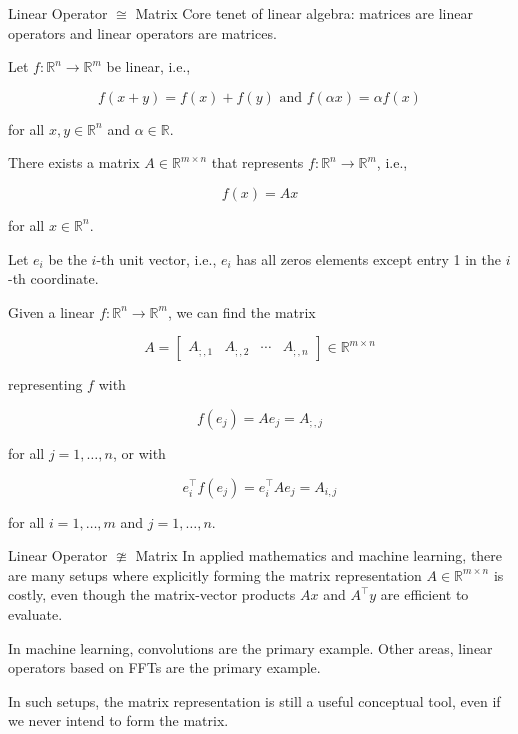 \begin{frame}[allowframebreaks]

\begin{myconceptblock}{8.12}{Linear Operator $\cong$ Matrix}
    Core tenet of linear algebra: matrices are linear operators and linear operators are matrices.

    Let $f: \mathbb{R}^{n} \rightarrow \mathbb{R}^{m}$ be linear, i.e.,

    $$
    f(x+y)=f(x)+f(y) \text { and } f(\alpha x)=\alpha f(x)
    $$

    for all $x, y \in \mathbb{R}^{n}$ and $\alpha \in \mathbb{R}$.

    There exists a matrix $A \in \mathbb{R}^{m \times n}$ that represents $f: \mathbb{R}^{n} \rightarrow \mathbb{R}^{m}$, i.e.,

    $$
    f(x)=A x
    $$

    for all $x \in \mathbb{R}^{n}$.

    Let $e_{i}$ be the $i$-th unit vector, i.e., $e_{i}$ has all zeros elements except entry 1 in the $i$-th coordinate.

    Given a linear $f: \mathbb{R}^{n} \rightarrow \mathbb{R}^{m}$, we can find the matrix

    $$
    A=\left[\begin{array}{llll}
    A_{;, 1} & A_{;, 2} & \cdots & A_{;, n}
    \end{array}\right] \in \mathbb{R}^{m \times n}
    $$

    representing $f$ with

    $$
    f\left(e_{j}\right)=A e_{j}=A_{;, j}
    $$

    for all $j=1, \ldots, n$, or with

    $$
    e_{i}^{\top} f\left(e_{j}\right)=e_{i}^{\top} A e_{j}=A_{i, j}
    $$

    for all $i=1, \ldots, m$ and $j=1, \ldots, n$.
\end{myconceptblock}

\end{frame}

\begin{frame}[allowframebreaks]

\begin{myconceptblock}{8.13}{Linear Operator $\ncong$ Matrix}
    In applied mathematics and machine learning, there are many setups where explicitly forming the matrix representation $A \in \mathbb{R}^{m \times n}$ is costly, even though the matrix-vector products $A x$ and $A^{\top} y$ are efficient to evaluate.

    In machine learning, convolutions are the primary example. Other areas, linear operators based on FFTs are the primary example.

    In such setups, the matrix representation is still a useful conceptual tool, even if we never intend to form the matrix.
\end{myconceptblock}

\end{frame}


